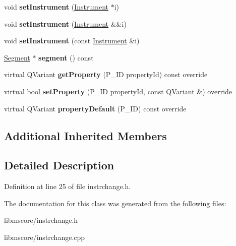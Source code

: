 \begin{DoxyCompactItemize}
\item 
\mbox{\label{class_ms_1_1_instrument_change_a0ea1495a2088ac5b22bbce2e37b30e52}} 
void {\bfseries set\+Instrument} (\hyperlink{class_ms_1_1_instrument}{Instrument} $\ast$i)
\item 
\mbox{\label{class_ms_1_1_instrument_change_a41ec79334a1fdf17e02598683f751faf}} 
void {\bfseries set\+Instrument} (\hyperlink{class_ms_1_1_instrument}{Instrument} \&\&i)
\item 
\mbox{\label{class_ms_1_1_instrument_change_aebcd84214462e2ed701b51c94ecb8394}} 
void {\bfseries set\+Instrument} (const \hyperlink{class_ms_1_1_instrument}{Instrument} \&i)
\item 
\mbox{\label{class_ms_1_1_instrument_change_ad72bba9be0ea20d9a4b5a0f5db372762}} 
\hyperlink{class_ms_1_1_segment}{Segment} $\ast$ {\bfseries segment} () const
\item 
\mbox{\label{class_ms_1_1_instrument_change_a3e38be6cbcc235e7804a3591e33c8d7c}} 
virtual Q\+Variant {\bfseries get\+Property} (P\+\_\+\+ID property\+Id) const override
\item 
\mbox{\label{class_ms_1_1_instrument_change_a98288d0c03e4cbcaa794ab302eaecc6b}} 
virtual bool {\bfseries set\+Property} (P\+\_\+\+ID property\+Id, const Q\+Variant \&) override
\item 
\mbox{\label{class_ms_1_1_instrument_change_abff1103fb1e4ab136d0e4a35e25c3a61}} 
virtual Q\+Variant {\bfseries property\+Default} (P\+\_\+\+ID) const override
\end{DoxyCompactItemize}
\subsection*{Additional Inherited Members}


\subsection{Detailed Description}


Definition at line 25 of file instrchange.\+h.



The documentation for this class was generated from the following files\+:\begin{DoxyCompactItemize}
\item 
libmscore/instrchange.\+h\item 
libmscore/instrchange.\+cpp\end{DoxyCompactItemize}
